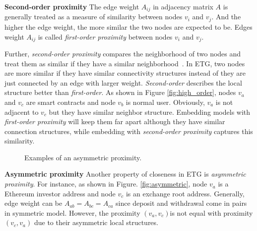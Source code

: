 \textbf{Second-order proximity} The edge weight $A_{ij}$ in adjacency matrix $A$ is generally treated as a measure of similarity between nodes $v_i$ and $v_j$. And the higher the edge weight, the more similar the two nodes are expected to be. Edges weight $A_{ij}$ is called \emph{first-order proximity} between nodes $v_i$ and $v_j$. 

Further, \emph{second-order proximity} compares the neighborhood of two nodes and treat them as similar if they have a similar neighborhood~\cite{goyal2018graph}. In ETG, two nodes are more similar if they have similar connectivity structures instead of they are just connected by an edge with larger weight. \emph{Second-order} describes the local structure better than \emph{first-order}. As shown in Figure \ref{fig:high_order}, nodes $v_a$ and $v_c$ are smart contracts and node $v_b$ is normal user. Obviously, $v_a$ is not adjacent to $v_c$  but they have similar neighbor structure. Embedding models with \emph{first-order proximity} will keep them far apart although they have similar connection structures, while embedding with \emph{second-order proximity} captures this similarity.


\begin{figure}[htbp]
	\centering
	\caption{Examples of an asymmetric proximity.}

\end{figure}

\textbf{Asymmetric proximity}
Another property of closeness in ETG is \emph{asymmetric proximity}. For instance, as shown in Figure. \ref{fig:asymmetric}, node $v_a$ is a Ethereum investor address and node $v_c$ is an exchange root address. Generally, edge weight can be $A_{ab}=A_{bc}=A_{ca}$ since deposit and withdrawal come in pairs in symmetric model. However, the proximity $(v_a,v_c)$is not equal with proximity $(v_c,v_a)$ due to their asymmetric local structures.

